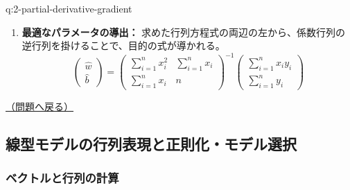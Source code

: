 \documentclass[
  pandoc]{bxjsarticle}
\begin{document}
\begin{answerbox}[phantomlabel=a:2-partial-derivative-gradient]{q:2-partial-derivative-gradient}
\begin{enumerate}
\[       \]
\item
  \textbf{最適なパラメータの導出：}
  求めた行列方程式の両辺の左から、係数行列の逆行列を掛けることで、目的の式が導かれる。
  \[
       \begin{pmatrix} \hat{w} \\ \hat{b} \end{pmatrix} = \begin{pmatrix} \sum_{i=1}^n x_i^2 & \sum_{i=1}^n x_i \\ \sum_{i=1}^n x_i & n \end{pmatrix}^{-1} \begin{pmatrix} \sum_{i=1}^n x_i y_i \\ \sum_{i=1}^n y_i \end{pmatrix}
       \]
\end{enumerate}

\hfill 

\hyperref[q:2-partial-derivative-gradient]{（問題へ戻る）}

\end{answerbox}

\subsection{線型モデルの行列表現と正則化・モデル選択}\label{ux7ddaux578bux30e2ux30c7ux30ebux306eux884cux5217ux8868ux73feux3068ux6b63ux5247ux5316ux30e2ux30c7ux30ebux9078ux629e-1}

\subsubsection{ベクトルと行列の計算}\label{ux30d9ux30afux30c8ux30ebux3068ux884cux5217ux306eux8a08ux7b97-1}
\end{document}
